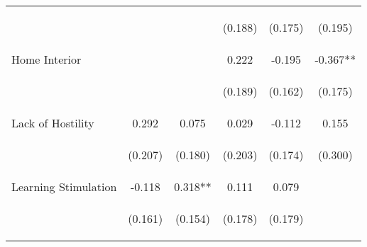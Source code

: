 \begin{tabular}{lccccc}
 & \begin{footnotesize}\end{footnotesize} & \begin{footnotesize}\end{footnotesize} & \begin{footnotesize}(0.188)\end{footnotesize} & \begin{footnotesize}(0.175)\end{footnotesize} & \begin{footnotesize}(0.195)\end{footnotesize}\\
\noalign{\smallskip}Home Interior &  &  & 0.222 & -0.195 & -0.367**\\
 & \begin{footnotesize}\end{footnotesize} & \begin{footnotesize}\end{footnotesize} & \begin{footnotesize}(0.189)\end{footnotesize} & \begin{footnotesize}(0.162)\end{footnotesize} & \begin{footnotesize}(0.175)\end{footnotesize}\\
\noalign{\smallskip}Lack of Hostility & 0.292 & 0.075 & 0.029 & -0.112 & 0.155\\
 & \begin{footnotesize}(0.207)\end{footnotesize} & \begin{footnotesize}(0.180)\end{footnotesize} & \begin{footnotesize}(0.203)\end{footnotesize} & \begin{footnotesize}(0.174)\end{footnotesize} & \begin{footnotesize}(0.300)\end{footnotesize}\\
\noalign{\smallskip}Learning Stimulation & -0.118 & 0.318** & 0.111 & 0.079 & \\
 & \begin{footnotesize}(0.161)\end{footnotesize} & \begin{footnotesize}(0.154)\end{footnotesize} & \begin{footnotesize}(0.178)\end{footnotesize} & \begin{footnotesize}(0.179)\end{footnotesize} & \begin{footnotesize}\end{footnotesize}\\

\end{tabular}
